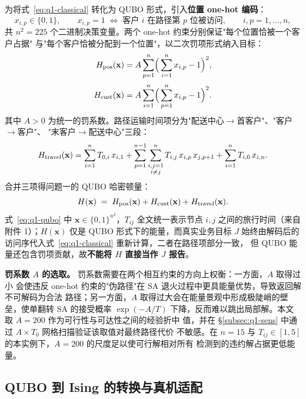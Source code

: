 \documentclass[UTF8,12pt,a4paper]{ctexart}
\begin{document}
为将式~\eqref{eq:q1-classical} 转化为 QUBO 形式，引入\textbf{位置 one-hot 编码}：
\begin{equation}
x_{i,p}\in\{0,1\},\qquad x_{i,p}=1 \;\Longleftrightarrow\; \text{客户 } i \text{ 在路径第 } p \text{ 位被访问},\qquad i,p=1,\dots,n,
\end{equation}
共 $n^{2}=225$ 个二进制决策变量。两个 one-hot 约束分别保证"每个位置恰被一个客户占据"
与"每个客户恰被分配到一个位置"，以二次罚项形式纳入目标：
\begin{align}
H_{\rm pos}(\mathbf{x}) &= A\sum_{p=1}^{n}\!\Big(\sum_{i=1}^{n} x_{i,p}-1\Big)^{2},
   \label{eq:q1-pos}\\[2pt]
H_{\rm cust}(\mathbf{x}) &= A\sum_{i=1}^{n}\!\Big(\sum_{p=1}^{n} x_{i,p}-1\Big)^{2}.
   \label{eq:q1-cust}
\end{align}
其中 $A>0$ 为统一的罚系数。路径运输时间项分为"配送中心$\to$首客户"、"客户$\to$客户"、
"末客户$\to$配送中心"三段：
\begin{equation}
\label{eq:q1-travel}
H_{\rm travel}(\mathbf{x})
= \sum_{i=1}^{n} T_{0,i}\,x_{i,1}
+ \sum_{p=1}^{n-1}\sum_{\substack{i,j=1\\ i\ne j}}^{n} T_{i,j}\,x_{i,p}\,x_{j,p+1}
+ \sum_{i=1}^{n} T_{i,0}\,x_{i,n}.
\end{equation}
合并三项得问题一的 QUBO 哈密顿量：
\begin{equation}
\label{eq:q1-qubo}
H(\mathbf{x}) \;=\; H_{\rm pos}(\mathbf{x}) + H_{\rm cust}(\mathbf{x}) + H_{\rm travel}(\mathbf{x}).
\end{equation}
式~\eqref{eq:q1-qubo} 中 $\mathbf{x}\in\{0,1\}^{n^{2}}$，$T_{ij}$ 全文统一表示节点 $i,j$
之间的旅行时间（来自附件 1）；$H(\mathbf{x})$ 仅是 QUBO 形式下的能量，而真实业务目标
$J$ 始终由解码后的访问序代入式~\eqref{eq:q1-classical} 重新计算，二者在路径项部分一致，
但 QUBO 能量还包含罚项贡献，故\textbf{不能将 $H$ 直接当作 $J$ 报告}。

\textbf{罚系数 $A$ 的选取。} 罚系数需要在两个相互约束的方向上权衡：一方面，$A$ 取得过小
会使违反 one-hot 约束的"伪路径"在 SA 退火过程中更具能量优势，导致返回解不可解码为合法
路径；另一方面，$A$ 取得过大会在能量景观中形成极陡峭的壁垒，使单翻转 SA 的接受概率
$\exp(-A/T)$ 下降，反而难以跳出局部解。本文取 $A=200$ 作为可行性与可达性之间的经验折中
值，并在 §\ref{subsec:q1-sens} 中通过 $A\times T_{0}$ 网格扫描验证该取值对最终路径代价
不敏感。在 $n=15$ 与 $T_{ij}\in[1,5]$ 的本实例下，$A=200$ 的尺度足以使可行解相对所有
检测到的违约解占据更低能量。

\subsection{QUBO 到 Ising 的转换与真机适配}
\end{document}
